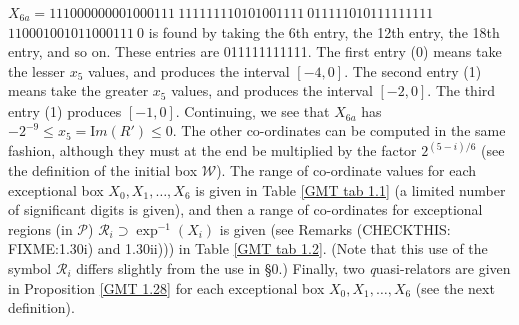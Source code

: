 \begin{remark}
\noindent 
$X_{6a} = 
111000000001000111\ 
111111110101001111\ 
011111010111111111$\hfill
{}
  \hfill $  
110001001011000111\ 0$
\vglue4pt\noindent 
is found by taking the 6th entry, the 12th entry, the 18th entry, and so on.  These entries are 011111111111.  The first entry (0) means take the
lesser $x_5$ values, and produces the interval $[-4,0].$  The second entry (1) means take the greater $x_5$ values, and produces the interval
$[-2,0].$  The third entry (1) produces $[-1,0].$  Continuing, we see that $X_{6a}^{\phantom{|}}$ has $-2^{-9} \le x_5 = {\mathrm Im}(R') \le 0.$  The other
co-ordinates can be computed in the same fashion, although they must at the end be multiplied by the factor $2^{(5 - i)/6}$ (see the definition of the
initial box
${\mathcal W}$).  The range of co-ordinate values for each  exceptional  box $X_0, X_1, \ldots, X_6$ is given in Table \ref{GMT tab 1.1} (a limited number of significant
digits is given), and  then a range of co-ordinates for exceptional regions (in ${\mathcal P}$) 
${\mathcal R}_i \supset \exp^{-1}(X_i)$ is given (see Remarks (CHECKTHIS: FIXME:1.30i) and 1.30ii))) in Table \ref{GMT tab 1.2}. (Note that this use of the symbol ${\mathcal R}_i$ differs
slightly from the use in \S 0.)
Finally, two {\textit quasi-relators} are given in Proposition \ref{GMT 1.28} for each exceptional box $X_0, X_1, \ldots, X_6$ (see the next definition).\end{remark}
 
